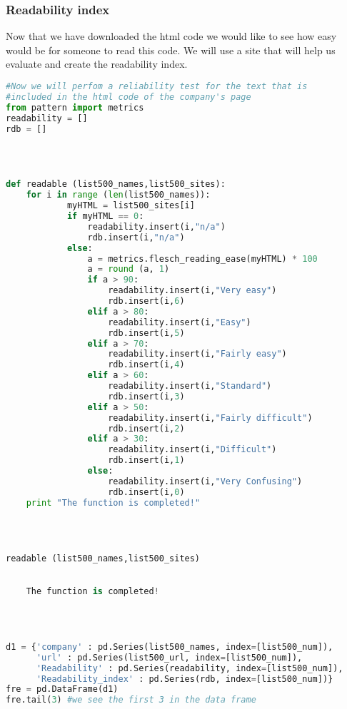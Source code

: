\documentclass{article}
\begin{document}
\subsubsection{Readability index}
Now that we have downloaded the html code we would like to see how easy would be for someone to read this code. We will use a site that will help us evaluate and create the readability index.
\begin{lstlisting}[language=Python]
#Now we will perfom a reliability test for the text that is 
#included in the html code of the company's page
from pattern import metrics
readability = []
rdb = []
 


 
def readable (list500_names,list500_sites):
    for i in range (len(list500_names)):
            myHTML = list500_sites[i]
            if myHTML == 0:
                readability.insert(i,"n/a")
                rdb.insert(i,"n/a")
            else:
                a = metrics.flesch_reading_ease(myHTML) * 100
                a = round (a, 1)
                if a > 90:    
                    readability.insert(i,"Very easy")
                    rdb.insert(i,6)
                elif a > 80:
                    readability.insert(i,"Easy")
                    rdb.insert(i,5)
                elif a > 70:
                    readability.insert(i,"Fairly easy")
                    rdb.insert(i,4)
                elif a > 60:
                    readability.insert(i,"Standard")
                    rdb.insert(i,3)
                elif a > 50:
                    readability.insert(i,"Fairly difficult")
                    rdb.insert(i,2)
                elif a > 30:
                    readability.insert(i,"Difficult")
                    rdb.insert(i,1)
                else:
                    readability.insert(i,"Very Confusing")
                    rdb.insert(i,0)                    
    print "The function is completed!"
 


 
readable (list500_names,list500_sites)
 

    The function is completed!
    


 
d1 = {'company' : pd.Series(list500_names, index=[list500_num]),
      'url' : pd.Series(list500_url, index=[list500_num]),
      'Readability' : pd.Series(readability, index=[list500_num]),
      'Readability_index' : pd.Series(rdb, index=[list500_num])}
fre = pd.DataFrame(d1)    
fre.tail(3) #we see the first 3 in the data frame
\end{lstlisting}
\end{document}
